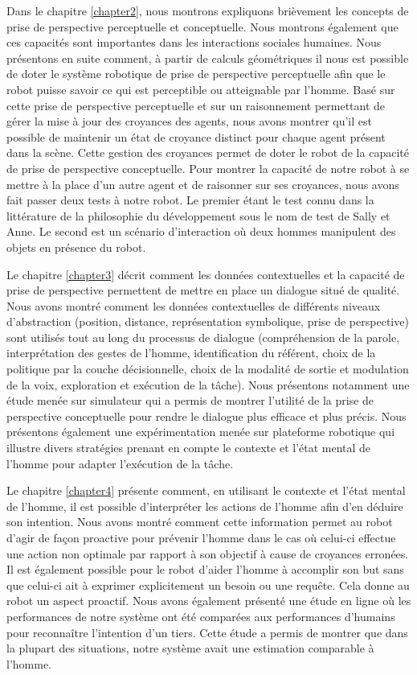 \documentclass[a4paper,11pt,twoside]{StyleThese}
\begin{document}
Dans le chapitre \ref{chapter2}, nous montrons expliquons brièvement les concepts de prise de perspective perceptuelle et conceptuelle. Nous montrons également que ces capacités sont importantes dans les interactions sociales humaines. Nous présentons en suite comment, à partir de calculs géométriques il nous est possible de doter le système robotique de prise de perspective perceptuelle afin que le robot puisse savoir ce qui est perceptible ou atteignable par l'homme.
Basé sur cette prise de perspective perceptuelle et sur un raisonnement permettant de gérer la mise à jour des croyances des agents, nous avons montrer qu'il est possible de maintenir un état de croyance distinct pour chaque agent présent dans la scène. Cette gestion des croyances permet de doter le robot de la capacité de prise de perspective conceptuelle.
Pour montrer la capacité de notre robot à se mettre à la place d'un autre agent et de raisonner sur ses croyances, nous avons fait passer deux tests à notre robot. Le premier étant le test connu dans la littérature de la philosophie du développement sous le nom de test de Sally et Anne. Le second est un scénario d'interaction où deux hommes manipulent des objets en présence du robot.

Le chapitre \ref{chapter3} décrit comment les données contextuelles et la capacité de prise de perspective permettent de mettre en place un dialogue situé de qualité. Nous avons montré comment les données contextuelles de différents niveaux d'abstraction (position, distance, représentation symbolique, prise de perspective) sont utilisés tout au long du processus de dialogue (compréhension de la parole, interprétation des gestes de l'homme, identification du référent, choix de la politique par la couche décisionnelle, choix de la modalité de sortie et modulation de la voix, exploration et exécution de la tâche).
Nous présentons notamment une étude menée sur simulateur qui a permis de montrer l'utilité de la prise de perspective conceptuelle pour rendre le dialogue plus efficace et plus précis. Nous présentons également une expérimentation menée sur plateforme robotique qui illustre divers stratégies prenant en compte le contexte et l'état mental de l'homme pour adapter l'exécution de la tâche.

Le chapitre \ref{chapter4} présente comment, en utilisant le contexte et l'état mental de l'homme, il est possible d'interpréter les actions de l'homme afin d'en déduire son intention. Nous avons montré comment cette information permet au robot d'agir de façon proactive pour prévenir l'homme dans le cas où celui-ci effectue une action non optimale par rapport à son objectif à cause de croyances erronées. Il est également possible pour le robot d'aider l'homme à accomplir son but sans que celui-ci ait à exprimer explicitement un besoin ou une requête. Cela donne au robot un aspect proactif. Nous avons également présenté une étude en ligne où les performances de notre système ont été comparées aux performances d'humains pour reconnaître l'intention d'un tiers. Cette étude a permis de montrer que dans la plupart des situations, notre système avait une estimation comparable à l'homme.
\end{document}
